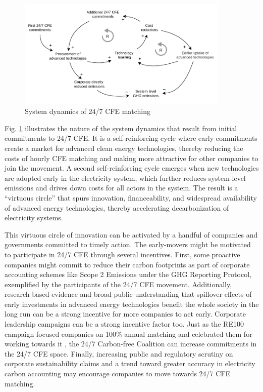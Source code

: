 \documentclass[pdflatex,sn-basic, Numbered]{sn-jnl}
\theoremstyle{thmstyleone}%
\theoremstyle{thmstyletwo}%
\theoremstyle{thmstylethree}%
\begin{document}
\begin{figure}[h]
    \centering
    \includegraphics[width=0.9\textwidth]{images/virtuous_dynamics.pdf}
    \caption{System dynamics of 24/7 CFE matching}\label{fig:dynamics}
\end{figure}

Fig. \ref{fig:dynamics} illustrates the nature of the system dynamics that result from initial commitments to 24/7 CFE. It is a self-reinforcing cycle where early commitments create a market for advanced clean energy technologies, thereby reducing the costs of hourly CFE matching and making more attractive for other companies to join the movement. A second self-reinforcing cycle emerges when new technologies are adopted early in the electricity system, which further reduces system-level emissions and drives down costs for all actors in the system. The result is a \enquote{virtuous circle} that spurs innovation, financeability, and widespread availability of advanced energy technologies, thereby accelerating decarbonization of electricity systems.

This virtuous circle of innovation can be activated by a handful of companies and governments committed to timely action. The early-movers might be motivated to participate in 24/7 CFE through several incentives. First, some proactive companies might commit to reduce their carbon footprints as part of corporate accounting schemes like Scope 2 Emissions under the GHG Reporting Protocol, exemplified by the participants of the 24/7 CFE movement. Additionally, research-based evidence and broad public understanding that spillover effects of early investments in advanced energy technologies benefit the whole society in the long run can be a strong incentive for more companies to act early. Corporate leadership campaigns can be a strong incentive factor too. Just as the RE100 campaign focused companies on 100\% annual matching and celebrated them for working towards it \cite{re100RE1002023Annual2024}, the 24/7 Carbon-free Coalition can increase commitments in the 24/7 CFE space. Finally, increasing public and regulatory scrutiny on corporate sustainability claims and a trend toward greater accuracy in electricity carbon accounting may encourage companies to move towards 24/7 CFE matching.
\end{document}
